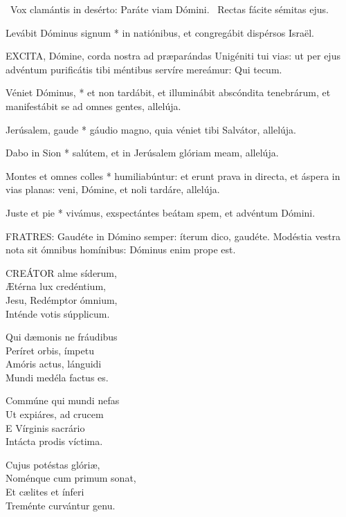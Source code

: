 \V\ Vox clamántis in desérto: Paráte viam Dómini. \R\ Rectas fácite sémitas ejus.

 Levábit Dóminus signum * in natiónibus, et congregábit dispérsos Israël.


\lettrine[lines=2]{E}{XCITA}, Dómine, corda nostra ad præparándas Unigéniti tui vias: ut per ejus advéntum purificátis tibi méntibus servíre mereámur: Qui tecum.


 Véniet Dóminus, * et non tardábit, et illuminábit abscóndita tenebrárum, et manifestábit se ad omnes gentes, allelúja.


 Jerúsalem, gaude * gáudio magno, quia véniet tibi Salvátor, allelúja.

 Dabo in Sion * salútem, et in Jerúsalem glóriam meam, allelúja.

 Montes et omnes colles * humiliabúntur: et erunt prava in directa, et áspera in vias planas: veni, Dómine, et noli tardáre, allelúja.

 Juste et pie * vivámus, exspectántes beátam spem, et advéntum Dómini.


\lettrine[lines=2]{F}{RATRES}: Gaudéte in Dómino semper: íterum dico, gaudéte. Modéstia vestra nota sit ómnibus homínibus: Dóminus enim prope est.


\lettrine[lines=2]{C}{REÁTOR} alme síderum,\\
Ætérna lux credéntium,\\
Jesu, Redémptor ómnium,\\
Inténde votis súpplicum.

Qui dæmonis ne fráudibus\\
Períret orbis, ímpetu\\
Amóris actus, lánguidi\\
Mundi medéla factus es.

Commúne qui mundi nefas\\
Ut expiáres, ad crucem\\
E Vírginis sacrário\\
Intácta prodis víctima.

Cujus potéstas glóriæ,\\
Noménque cum primum sonat,\\
Et cælites et ínferi\\
Treménte curvántur genu.

